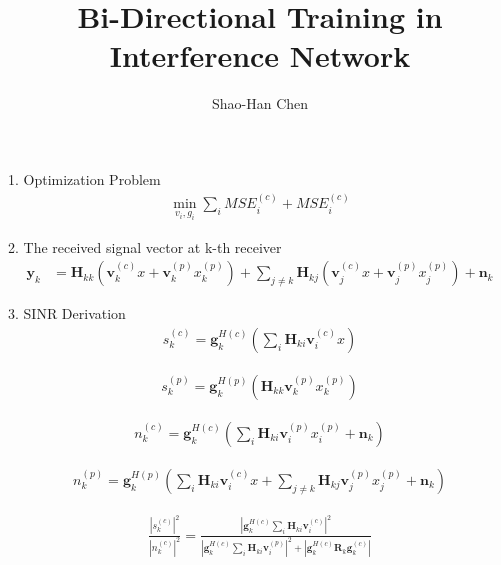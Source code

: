 \documentclass[11pt, oneside]{article}   	%
\title{Bi-Directional Training in Interference Network}
\author{Shao-Han Chen}
\begin{document}
\maketitle

1. Optimization Problem
\begin{align*}
\min_{v_{i} , g_{i}} \displaystyle\sum_{i} MSE^{(c)}_{i}+MSE^{(c)}_{i}
\end{align*}

2. The received signal vector at k-th receiver
\begin{align*}
\textbf{y}_{k} &= \textbf{H}_{kk}
			(\textbf{v}^{(c)}_{k}x
			+\textbf{v}^{(p)}_{k}x^{(p)}_{k})
			+\displaystyle\sum_{j \neq k}\textbf{H}_{kj}(\textbf{v}^{(c)}_{j}x+\textbf{v}^{(p)}_{j}x^{(p)}_{j})
			+\textbf{n}_{k}
\end{align*}

3. SINR Derivation
\begin{align*}
s^{(c)}_{k} = \textbf{g}^{H(c)}_{k}
		(\displaystyle\sum_{i}
		\textbf{H}_{ki} 
		\textbf{v}^{(c)}_{i}x)
\end{align*}

\begin{align*}
s^{(p)}_{k} = \textbf{g}^{H(p)}_{k}
		(\textbf{H}_{kk} 
		\textbf{v}^{(p)}_{k}x^{(p)}_{k})
\end{align*}

\begin{align*}
n^{(c)}_{k} = \textbf{g}^{H(c)}_{k}
		(\displaystyle\sum_{i}
		\textbf{H}_{ki} 
		\textbf{v}^{(p)}_{i}x^{(p)}_{i}
		+\textbf{n}_{k})
\end{align*}

\begin{align*}
n^{(p)}_{k} = \textbf{g}^{H(p)}_{k}
		(\displaystyle\sum_{i}
		\textbf{H}_{ki} 
		\textbf{v}^{(c)}_{i}x
		+\displaystyle\sum_{j \neq k}\textbf{H}_{kj}\textbf{v}^{(p)}_{j}x^{(p)}_{j}
		+\textbf{n}_{k})
\end{align*}

\begin{align*}
\frac	{	|s^{(c)}_{k}|^2	}{	|n^{(c)}_{k}|^2	} = 
\frac {|\textbf{g}^{H(c)}_{k}
		\displaystyle\sum_{i}
		\textbf{H}_{ki} 
		\textbf{v}^{(c)}_{i}|^2	
	} 
	{	|\textbf{g}^{H(c)}_{k}
		\displaystyle\sum_{i}
		\textbf{H}_{ki} 
		\textbf{v}^{(p)}_{i}|^2
		+|\textbf{g}^{H(c)}_{k}
		\textbf{R}_{k}
		\textbf{g}^{(c)}_{k}|
	}
\end{align*}
\end{document}
